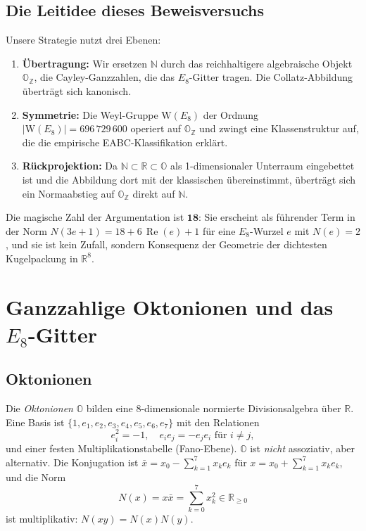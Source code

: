\documentclass[12pt,a4paper]{article}
\newcommand{\OZ}{\mathbb{O}_{\mathbb{Z}}}  %
\newcommand{\OO}{\mathbb{O}}       %
\newcommand{\Norm}[1]{N(#1)}       %
\renewcommand{\Re}{\operatorname{Re}}
\newcommand{\WE}{\mathrm{W}(E_8)}  %
\newcommand{\N}{\mathbb{N}}
\newcommand{\R}{\mathbb{R}}
\begin{document}
\subsection*{Die Leitidee dieses Beweisversuchs}

Unsere Strategie nutzt drei Ebenen:

\begin{enumerate}[label=(\arabic*)]
  \item \textbf{Übertragung:} Wir ersetzen $\N$ durch das reichhaltigere
    algebraische Objekt $\OZ$, die Cayley-Ganzzahlen, die das $E_8$-Gitter
    tragen. Die Collatz-Abbildung überträgt sich kanonisch.

  \item \textbf{Symmetrie:} Die Weyl-Gruppe $\WE$ der Ordnung
    $|\WE| = 696\,729\,600$ operiert auf $\OZ$ und zwingt eine
    Klassenstruktur auf, die die empirische EABC-Klassifikation erklärt.

  \item \textbf{Rückprojektion:} Da $\N \subset \R \subset \OO$
    als 1-dimensionaler Unterraum eingebettet ist und die Abbildung
    dort mit der klassischen übereinstimmt, überträgt sich ein
    Normaabstieg auf $\OZ$ direkt auf $\N$.
\end{enumerate}

Die magische Zahl der Argumentation ist $\mathbf{18}$: Sie erscheint
als führender Term in der Norm $\Norm{3e+1} = 18 + 6\,\Re(e) + 1$
für eine $E_8$-Wurzel $e$ mit $\Norm{e}=2$, und sie ist kein Zufall,
sondern Konsequenz der Geometrie der dichtesten Kugelpackung in $\R^8$.

\section{Ganzzahlige Oktonionen und das \texorpdfstring{$E_8$}{E8}-Gitter}

\subsection{Oktonionen}

Die \emph{Oktonionen} $\OO$ bilden eine 8-dimensionale normierte
Divisionsalgebra über $\R$. Eine Basis ist
$\{1, e_1, e_2, e_3, e_4, e_5, e_6, e_7\}$ mit den Relationen
\[
  e_i^2 = -1,\quad e_i e_j = -e_j e_i \text{ für } i\neq j,
\]
und einer festen Multiplikationstabelle (Fano-Ebene).
$\OO$ ist \emph{nicht} assoziativ, aber alternativ.
Die Konjugation ist $\bar{x} = x_0 - \sum_{k=1}^7 x_k e_k$
für $x = x_0 + \sum_{k=1}^7 x_k e_k$, und die Norm
\[
  \Norm{x} = x\bar{x} = \sum_{k=0}^7 x_k^2 \in \R_{\geq 0}
\]
ist multiplikativ: $\Norm{xy} = \Norm{x}\Norm{y}$.
\end{document}
